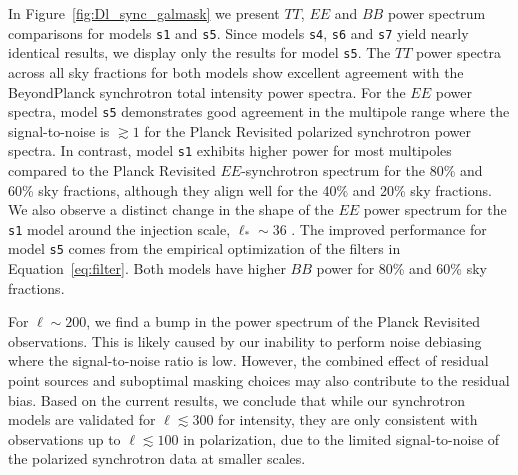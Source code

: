 \documentclass[twocolumn]{aastex631}
\begin{document}
In Figure~\ref{fig:Dl_sync_galmask} we present $TT$, $EE$ and $BB$ power spectrum comparisons for models \texttt{s1} and \texttt{s5}. Since models \texttt{s4}, \texttt{s6} and \texttt{s7} yield nearly identical results, we display only the results for model \texttt{s5}. The $TT$ power spectra across all sky fractions for both models show excellent agreement with the BeyondPlanck synchrotron total intensity power spectra. For the $EE$ power spectra, model \texttt{s5} demonstrates good agreement in the multipole range where the signal-to-noise is $\gtrsim 1$ for the Planck Revisited polarized synchrotron power spectra. In contrast, model \texttt{s1} exhibits higher power for most multipoles compared to the Planck Revisited $EE$-synchrotron spectrum for the 80\% and 60\% sky fractions, although they align well for the 40\% and 20\% sky fractions. We also observe a distinct change in the shape of the $EE$ power spectrum for the \texttt{s1} model around the injection scale, $\ell_*\sim 36$ \citep{Thorne:2017}. The improved performance for model \texttt{s5} comes from the empirical optimization of the filters in Equation~\ref{eq:filter}. Both models have higher $BB$ power for 80\% and 60\% sky fractions.

For $\ell \sim 200$, we find a bump in the power spectrum of the Planck Revisited observations. This is likely caused by our inability to perform noise debiasing where the signal-to-noise ratio is low. However, the combined effect of residual point sources and suboptimal masking choices may also contribute to the residual bias. Based on the current results, we conclude that while our synchrotron models are validated for $\ell \lesssim 300$ for intensity, they are only consistent with observations up to $\ell \lesssim 100$ in polarization, due to the limited signal-to-noise of the polarized synchrotron data at smaller scales.
\end{document}
